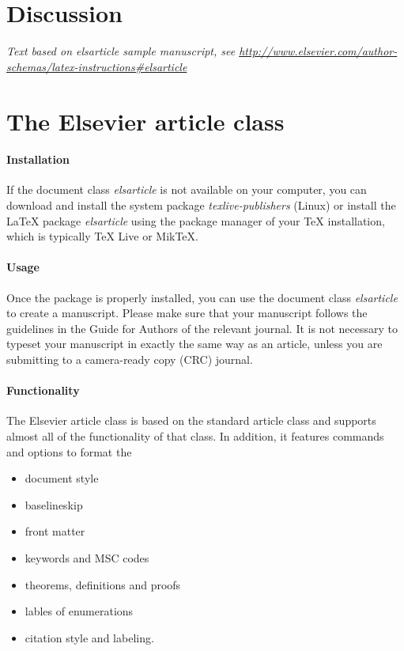 \documentclass[]{elsarticle} %
\begin{document}
\section{Discussion}\label{discussion}

\emph{Text based on elsarticle sample manuscript, see
\url{http://www.elsevier.com/author-schemas/latex-instructions\#elsarticle}}

\section{The Elsevier article class}\label{the-elsevier-article-class}

\paragraph{Installation}\label{installation}

If the document class \emph{elsarticle} is not available on your
computer, you can download and install the system package
\emph{texlive-publishers} (Linux) or install the LaTeX package
\emph{elsarticle} using the package manager of your TeX installation,
which is typically TeX Live or MikTeX.

\paragraph{Usage}\label{usage}

Once the package is properly installed, you can use the document class
\emph{elsarticle} to create a manuscript. Please make sure that your
manuscript follows the guidelines in the Guide for Authors of the
relevant journal. It is not necessary to typeset your manuscript in
exactly the same way as an article, unless you are submitting to a
camera-ready copy (CRC) journal.

\paragraph{Functionality}\label{functionality}

The Elsevier article class is based on the standard article class and
supports almost all of the functionality of that class. In addition, it
features commands and options to format the

\begin{itemize}
\item
  document style
\item
  baselineskip
\item
  front matter
\item
  keywords and MSC codes
\item
  theorems, definitions and proofs
\item
  lables of enumerations
\item
  citation style and labeling.
\end{itemize}
\end{document}
